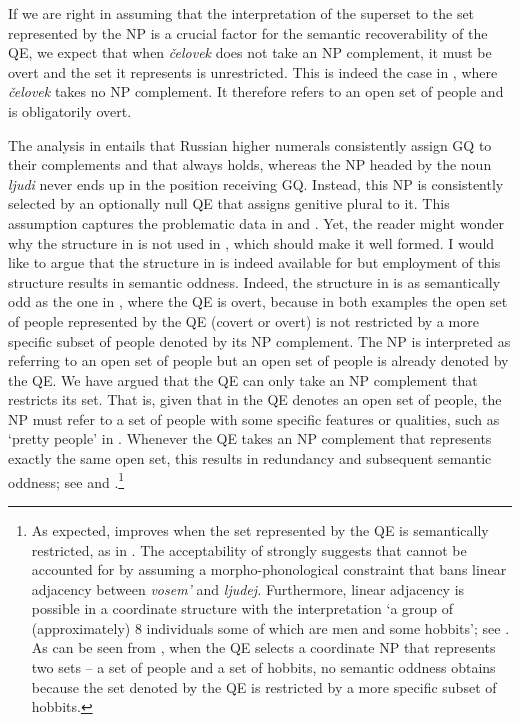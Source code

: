 \documentclass[output=paper,
modfonts,
newtxmath,
hidelinks
]{langscibook}
\begin{document}
If we are right in assuming that the interpretation of the superset to the set represented by the NP is a crucial factor for the semantic recoverability of the QE, we expect that when \textit{čelovek} does not take an NP complement, it must be overt and the set it represents is unrestricted. This is indeed the case in , where \textit{čelovek} takes no NP complement. It therefore refers to an open set of people and is obligatorily overt.

The analysis in  entails that Russian higher numerals consistently assign GQ to their complements and that  always holds, whereas the NP headed by the noun \textit{ljudi} never ends up in the position receiving GQ. Instead, this NP is consistently selected by an optionally null QE that assigns genitive plural to it. This assumption captures the problematic data in  and . Yet, the reader might wonder why the structure in  is not used in , which should make it well formed. I would like to argue that the structure in  is indeed available for  but employment of this structure results in semantic oddness. Indeed, the structure in  is as semantically odd as the one in , where the QE is overt, because in both examples the open set of people represented by the QE (covert or overt) is not restricted by a more specific subset of people denoted by its NP complement. The NP is interpreted as referring to an open set of people but an open set of people is already denoted by the QE. We have argued that the QE can only take an NP complement that restricts its set. That is, given that in  the QE denotes an open set of people, the NP must refer to a set of people with some specific features or qualities, such as ‘pretty people’ in . Whenever the QE takes an NP complement that represents exactly the same open set, this results in redundancy and subsequent semantic oddness; see  and .\footnote{\label{18:fn13}As expected,  improves when the set represented by the QE is semantically restricted, as in . The acceptability of  strongly suggests that  cannot be accounted for by assuming a morpho-phonological constraint that bans linear adjacency between \textit{vosem’} and \textit{ljudej.} Furthermore, linear adjacency is possible in a coordinate structure with the interpretation ‘a group of (approximately) 8 individuals some of which are men and some hobbits’; see . As can be seen from , when the QE selects a coordinate NP that represents two sets -- a set of people and a set of hobbits, no semantic oddness obtains because the set denoted by the QE is restricted by a more specific subset of hobbits.
\z

}
\end{document}
